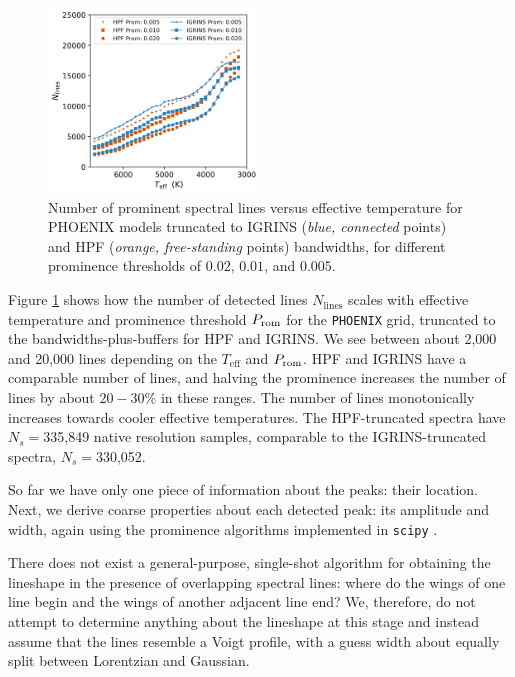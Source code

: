 \documentclass[modern]{aastex631}
\begin{document}
\begin{figure}[hbt!]
    \centering
    \includegraphics[width=0.5\textwidth]{figures/N_lines_vs_Teff_prom.png}
    \caption{Number of prominent spectral lines versus effective temperature for PHOENIX models truncated to IGRINS (\emph{blue, connected} points) and HPF (\emph{orange, free-standing} points) bandwidths, for different prominence thresholds of $0.02$, $0.01$, and $0.005$.}
    \label{fig_Nlines_vs_teff}
\end{figure}


Figure \ref{fig_Nlines_vs_teff} shows how the number of detected lines $N_{\mathrm{lines}}$ scales with effective temperature and prominence threshold $P_{\rm rom}$ for the \texttt{PHOENIX} grid, truncated to the bandwidths-plus-buffers for HPF and IGRINS. We see between about 2,000 and 20,000 lines depending on the $T_{\mathrm{eff}}$ and $P_{\rm rom}$. HPF and IGRINS have a comparable number of lines, and halving the prominence increases the number of lines by about $20-30\%$ in these ranges. The number of lines monotonically increases towards cooler effective temperatures.
The HPF-truncated spectra have $N_s=$335,849 native resolution samples, comparable to the IGRINS-truncated spectra, $N_s=$330,052.

So far we have only one piece of information about the peaks: their location. Next, we derive coarse properties about each detected peak: its amplitude and width, again using the prominence algorithms implemented in \texttt{scipy} \citep{2020SciPy-NMeth}.

There does not exist a general-purpose, single-shot algorithm for obtaining the lineshape in the presence of overlapping spectral lines: where do the wings of one line begin and the wings of another adjacent line end? We, therefore, do not attempt to determine anything about the lineshape at this stage and instead assume that the lines resemble a Voigt profile, with a guess width about equally split between Lorentzian and Gaussian.
\end{document}

